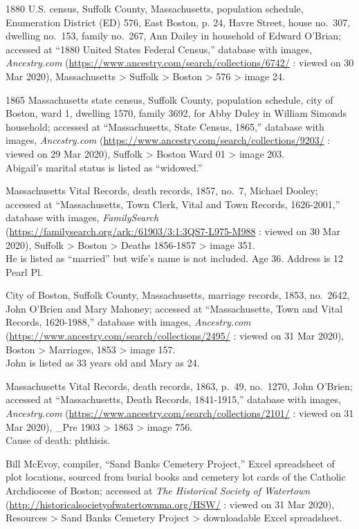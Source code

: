 \begin{thebibliography}{999}
	1880 U.S. census, Suffolk County, Massachusetts, population schedule, Enumeration District (ED) 576, East Boston, p. 24, Havre Street, house no.\ 307, dwelling no.\ 153, family no.\ 267, Ann Dailey in household of Edward O'Brian; accessed at ``1880 United States Federal Census,'' database with images, \textit{Ancestry.com} (\url{https://www.ancestry.com/search/collections/6742/} : viewed on 30 Mar 2020), Massachusetts > Suffolk > Boston > 576 > image 24.

	1865 Massachusetts state census, Suffolk County, population schedule, city of Boston, ward 1, dwelling 1570, family 3692, for Abby Duley in William Simonds household; accessed at ``Massachusetts, State Census, 1865,'' database with images, \textit{Ancestry.com} (\url{https://www.ancestry.com/search/collections/9203/} : viewed on 29 Mar 2020), Suffolk > Boston Ward 01 > image 203.\\
	Abigail's marital status is listed as ``widowed.''
	
	Massachusetts Vital Records, death records, 1857, no.\ 7, Michael Dooley; accessed at ``Massachusetts, Town Clerk, Vital and Town Records, 1626-2001,'' database with images, \textit{FamilySearch} (\url{https://familysearch.org/ark:/61903/3:1:3QS7-L975-M988} : viewed on 30 Mar 2020), Suffolk > Boston > Deaths 1856-1857 > image 351.\\
	He is listed as ``married'' but wife's name is not included. Age 36. Address is 12 Pearl Pl.
	
	City of Boston, Suffolk County, Massachusetts, marriage records, 1853, no.\ 2642, John O'Brien and Mary Mahoney; accessed at ``Massachusetts, Town and Vital Records, 1620-1988,'' database with images, \textit{Ancestry.com} (\url{https://www.ancestry.com/search/collections/2495/} : viewed on 31 Mar 2020), Boston > Marriages, 1853 > image 157.\\
	John is listed as 33 years old and Mary as 24.
	
	Massachusetts Vital Records, death records, 1863, p.\ 49, no.\ 1270, John O'Brien; accessed at ``Massachusetts, Death Records, 1841-1915,'' database with images, \textit{Ancestry.com} (\url{https://www.ancestry.com/search/collections/2101/} : viewed on 31 Mar 2020), \_Pre 1903 > 1863 > image 756.\\
	Cause of death: phthisis.
	
	Bill McEvoy, compiler, ``Sand Banks Cemetery Project,'' Excel spreadsheet of plot locations, sourced from burial books and cemetery lot cards of the Catholic Archdiocese of Boston; accessed at \textit{The Historical Society of Watertown} (\url{http://historicalsocietyofwatertownma.org/HSW/} : viewed on 31 Mar 2020), Resources > Sand Banks Cemetery Project > downloadable Excel spreadsheet.
	

\end{thebibliography}
